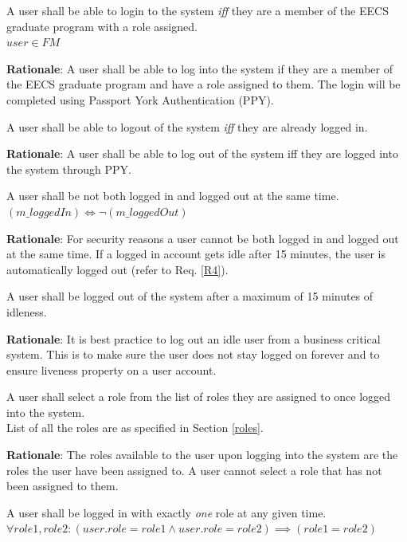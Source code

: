 \documentclass[fontsize=12pt,paper=letter,twoside]{scrartcl}
\begin{document}
\rdescription
{A user shall be able to login to the system \emph{iff} they are a member of the EECS graduate program with a role assigned.\\}
{$user \in FM$}
\label{R1}

\smallskip
\noindent \textbf{Rationale}: A user shall be able to log into the system if they are a member of the EECS graduate program and have a role assigned to them. The login will be completed using Passport York Authentication (PPY).

\genreq
{A user shall be able to logout of the system \emph{iff} they are already logged in.\\}
{}
\label{R2}

\smallskip
\noindent \textbf{Rationale}: A user shall be able to log out of the system iff they are logged into the system through PPY.

\rdescription
{A user shall be not both logged in and logged out at the same time.\\}
{$(m\_loggedIn) \iff \neg (m\_loggedOut)$}
\label{R3}

\smallskip
\noindent \textbf{Rationale}: For security reasons a user cannot be both logged in and logged out at the same time. If a logged in account gets idle after 15 minutes, the user is automatically logged out (refer to Req. \ref{R4}).

\genreq
{A user shall be logged out of the system after a maximum of 15 minutes of idleness.\\}
{}
\label{R4}

\smallskip
\noindent \textbf{Rationale}: It is best practice to log out an idle user from a business critical system. This is to make sure the user does not stay logged on forever and to ensure liveness property on a user account.

\rdescription
{A user shall select a role from the list of roles they are assigned to once logged into the system.\\}
{List of all the roles are as specified in Section \ref{roles}.}
\label{R5}

\smallskip
\noindent \textbf{Rationale}: The roles available to the user upon logging into the system are the roles the user have been assigned to. A user cannot select a role that has not been assigned to them.

\rdescription
{A user shall be logged in with exactly \emph{one} role at any given time.\\}
{$\forall role1, role2 : (user.role = role1 \land user.role = role2) \implies (role1 = role2)$}
\label{R6}
\end{document}
